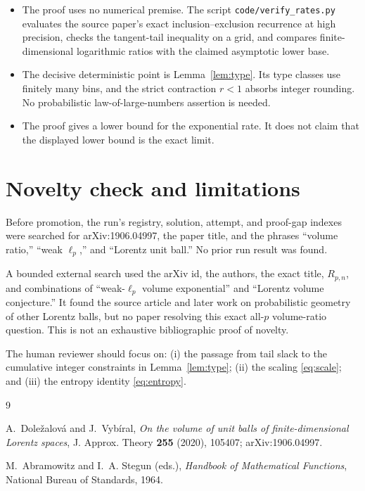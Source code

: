 \documentclass[11pt]{article}
\newcommand{\1}{\mathbf 1}
\begin{document}
\begin{itemize}
\item The proof uses no numerical premise.  The script
\texttt{code/verify\_rates.py} evaluates the source paper's exact
inclusion--exclusion recurrence at high precision, checks the tangent-tail
inequality on a grid, and compares finite-dimensional logarithmic ratios
with the claimed asymptotic lower base.
\item The decisive deterministic point is Lemma~\ref{lem:type}.  Its type
classes use finitely many bins, and the strict contraction \(r<1\) absorbs
integer rounding.  No probabilistic law-of-large-numbers assertion is needed.
\item The proof gives a lower bound for the exponential rate.  It does not
claim that the displayed lower bound is the exact limit.
\end{itemize}

\section{Novelty check and limitations}

Before promotion, the run's registry, solution, attempt, and proof-gap
indexes were searched for arXiv:1906.04997, the paper title, and the phrases
``volume ratio,'' ``weak \(\ell_p\),'' and ``Lorentz unit ball.''  No prior
run result was found.

A bounded external search used the arXiv id, the authors, the exact title,
\(R_{p,n}\), and combinations of ``weak-\(\ell_p\) volume exponential'' and
``Lorentz volume conjecture.''  It found the source article and later work
on probabilistic geometry of other Lorentz balls, but no paper resolving
this exact all-\(p\) volume-ratio question.  This is not an exhaustive
bibliographic proof of novelty.

The human reviewer should focus on: (i) the passage from tail slack to the
cumulative integer constraints in Lemma~\ref{lem:type}; (ii) the scaling
\eqref{eq:scale}; and (iii) the entropy identity \eqref{eq:entropy}.

\begin{thebibliography}{9}

A.~Dole\v{z}alov\'a and J.~Vyb\'iral,
\emph{On the volume of unit balls of finite-dimensional Lorentz spaces},
J. Approx. Theory \textbf{255} (2020), 105407;
arXiv:1906.04997.

M.~Abramowitz and I.~A. Stegun (eds.),
\emph{Handbook of Mathematical Functions},
National Bureau of Standards, 1964.

\end{thebibliography}
\end{document}
